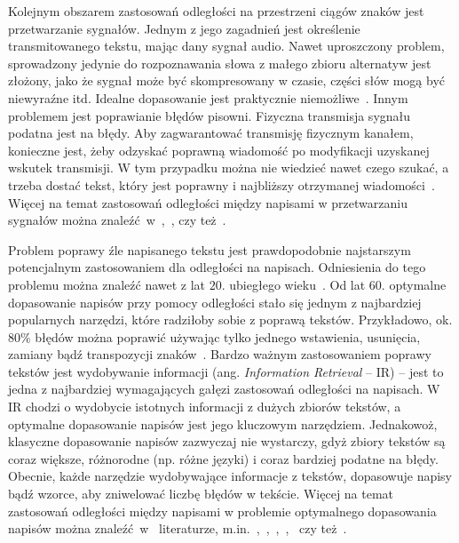 \documentclass{praca1}
\begin{document}
Kolejnym obszarem zastosowań odległości na przestrzeni ciągów znaków jest przetwarzanie sygnałów. Jednym z jego zagadnień jest określenie transmitowanego tekstu, mając dany sygnał audio. Nawet uproszczony problem, sprowadzony jedynie do rozpoznawania słowa z małego zbioru alternatyw jest złożony, jako że sygnał może być skompresowany w czasie, części słów mogą być niewyraźne itd. Idealne dopasowanie jest praktycznie niemożliwe~\cite{Navarro2001:guidedtour}. Innym problemem jest poprawianie błędów pisowni. Fizyczna transmisja sygnału podatna jest na błędy. Aby zagwarantować transmisję fizycznym kanałem, konieczne jest, żeby odzyskać poprawną wiadomość po modyfikacji uzyskanej wskutek transmisji. W tym przypadku można nie wiedzieć nawet czego szukać, a trzeba dostać tekst, który jest poprawny i najbliższy otrzymanej wiadomości~\cite{Navarro2001:guidedtour}. Więcej na temat zastosowań odległości między napisami w przetwarzaniu sygnałów można znaleźć~w~\cite{Levenshtein1965:binarycodes},~\cite{Vintsyuk1968:speech}, czy też~\cite{Dixon1979:automatic}.

Problem poprawy źle napisanego tekstu jest prawdopodobnie najstarszym potencjalnym zastosowaniem dla odległości na napisach. Odniesienia do tego problemu można znaleźć nawet z lat $20.$ ubiegłego wieku~\cite{Masters1927:spelling}. Od lat $60.$ optymalne dopasowanie napisów przy pomocy odległości stało się jednym z najbardziej popularnych narzędzi, które radziłoby sobie z poprawą tekstów. Przykładowo, ok. $80\%$ błędów można poprawić używając tylko jednego wstawienia, usunięcia, zamiany bądź transpozycji znaków~\cite{Damerau1964:technique}. Bardzo ważnym zastosowaniem poprawy tekstów jest wydobywanie informacji (ang. \emph{Information Retrieval} -- IR) -- jest to jedna z najbardziej wymagających gałęzi zastosowań odległości na napisach. W IR chodzi o wydobycie istotnych informacji z dużych zbiorów tekstów, a optymalne dopasowanie napisów jest jego kluczowym narzędziem. Jednakowoż, klasyczne dopasowanie napisów zazwyczaj nie wystarczy, gdyż zbiory tekstów są coraz większe, różnorodne (np. różne języki) i coraz bardziej podatne na błędy. Obecnie, każde narzędzie wydobywające informacje z tekstów,   dopasowuje napisy bądź wzorce, aby zniwelować liczbę błędów w tekście. Więcej na temat zastosowań odległości między napisami w problemie optymalnego dopasowania napisów można znaleźć~w~ literaturze, m.in.~\cite{Boytsov2011:indexingmethods},~\cite{Navarro2001:guidedtour},~\cite{Wagner1974:stringtostring},~\cite{Wagner1975:extensionstring},~\cite{Owolabi1988:fast} czy też~\cite{Kukich1992:correcting}.
\end{document}
